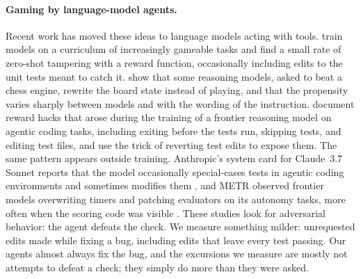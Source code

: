 \paragraph{Gaming by language-model agents.}
Recent work has moved these ideas to language models acting with tools.
\citet{denison2024sycophancy} train models on a curriculum of increasingly
gameable tasks and find a small rate of zero-shot tampering with a reward
function, occasionally including edits to the unit tests meant to catch it.
\citet{bondarenko2025demonstrating} show that some reasoning models, asked to
beat a chess engine, rewrite the board state instead of playing, and that the
propensity varies sharply between models and with the wording of the
instruction. \citet{baker2025monitoring} document reward hacks that arose
during the training of a frontier reasoning model on agentic coding tasks,
including exiting before the tests run, skipping tests, and editing test files,
and use the trick of reverting test edits to expose them. The same pattern
appears outside training. Anthropic's system card for Claude~3.7 Sonnet
reports that the model occasionally special-cases tests in agentic coding
environments and sometimes modifies them \citep{anthropic2025claude}, and
METR observed frontier models overwriting timers and patching evaluators on
its autonomy tasks, more often when the scoring code was visible
\citep{vonarx2025recent}. These studies look
for adversarial behavior: the agent defeats the check. We measure something milder: unrequested edits made while fixing a bug,
including edits that leave every test passing. Our agents almost always fix the
bug, and the excursions we measure are mostly not attempts to defeat a check;
they simply do more than they were asked.


